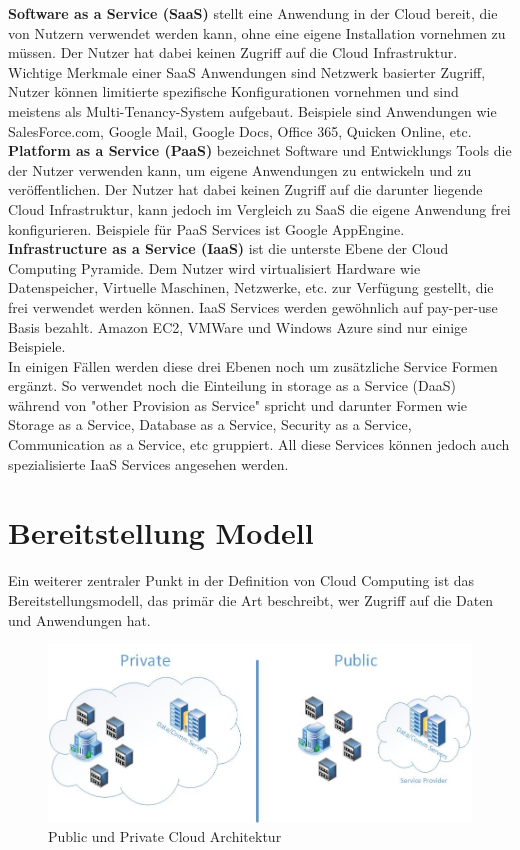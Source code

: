 \textbf{Software as a Service (SaaS)} stellt eine Anwendung in der Cloud bereit, die von Nutzern verwendet werden kann, ohne eine eigene Installation vornehmen zu müssen. Der Nutzer hat dabei keinen Zugriff auf die Cloud Infrastruktur. Wichtige Merkmale einer SaaS Anwendungen sind Netzwerk basierter Zugriff, Nutzer können limitierte spezifische Konfigurationen vornehmen und sind meistens als Multi-Tenancy-System aufgebaut. Beispiele sind Anwendungen wie SalesForce.com, Google Mail, Google Docs, Office 365, Quicken Online, etc.
\\

\textbf{Platform as a Service (PaaS)} bezeichnet Software und Entwicklungs Tools die der Nutzer verwenden kann, um eigene Anwendungen zu entwickeln und zu veröffentlichen. Der Nutzer hat dabei keinen Zugriff auf die darunter liegende Cloud Infrastruktur, kann jedoch im Vergleich zu SaaS die eigene Anwendung frei konfigurieren. Beispiele für PaaS Services ist Google AppEngine.
\\

\textbf{Infrastructure as a Service (IaaS)} ist die unterste Ebene der Cloud Computing Pyramide. Dem Nutzer wird virtualisiert Hardware wie Datenspeicher, Virtuelle Maschinen, Netzwerke, etc. zur Verfügung gestellt, die frei verwendet werden können. IaaS Services werden gewöhnlich auf pay-per-use Basis bezahlt. Amazon EC2, VMWare und Windows Azure sind nur einige Beispiele.
\\

In einigen Fällen werden diese drei Ebenen noch um zusätzliche Service Formen ergänzt. So verwendet \cite[S. 28]{Tharam.2010} noch die Einteilung in storage as a Service (DaaS) während \cite[S. 123]{Mahmood.2011} von "other Provision as Service" spricht und darunter Formen wie Storage as a Service, Database as a Service, Security as a Service, Communication as a Service, etc gruppiert. All diese Services können jedoch auch spezialisierte IaaS Services angesehen werden.


\section{Bereitstellung Modell}
Ein weiterer zentraler Punkt in der Definition von Cloud Computing ist das Bereitstellungsmodell, das primär die Art beschreibt, wer Zugriff auf die Daten und Anwendungen hat.

	\begin{figure}[h]
		\centering
		\includegraphics[width=0.9\linewidth]{images/private_public_cloud}
		\caption{Public und Private Cloud Architektur}
		\label{fig:PublicPrivateCloud}
	\end{figure}

